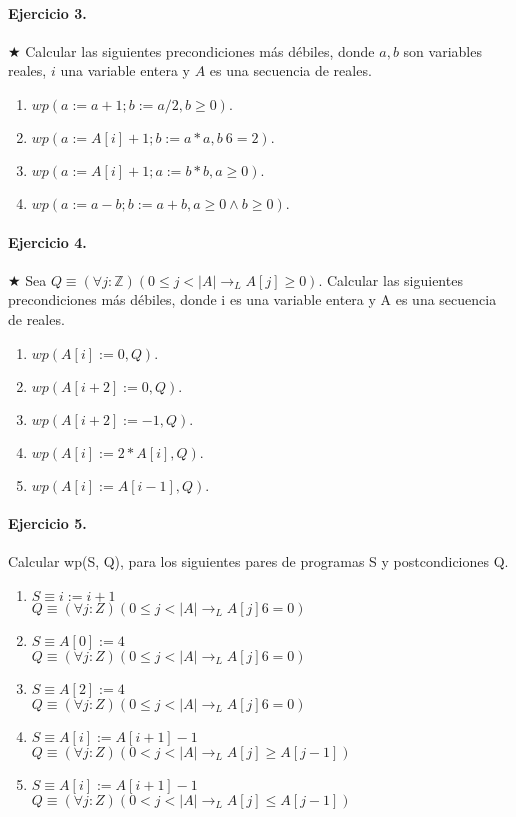 \documentclass{article}
\begin{document}
\paragraph{Ejercicio 3.} $\bigstar$ Calcular las siguientes precondiciones más débiles, donde 
$a, b$ son variables reales, $i$ una variable entera y $A$
es una secuencia de reales.

\begin{enumerate}[label=\alph*)]
\item $wp(a := a+1; b := a/2, b \geq 0).$
\item $wp(a := A[i] + 1; b := a*a, b\  6= 2).$
\item $wp(a := A[i] + 1; a := b*b, a \geq 0).$
\item $wp(a := a-b; b := a+b, a \geq 0 \wedge b \geq 0).$
\end{enumerate}

\paragraph{Ejercicio 4.} $\bigstar$ Sea $Q \equiv (\forall j :\mathbb{Z})(0 \leq j < |A| \rightarrow_L
 A[j] \geq 0)$. Calcular las 
siguientes precondiciones más débiles, donde i es
una variable entera y A es una secuencia de reales.

\begin{enumerate}[label=\alph*)]
\item $wp(A[i] := 0, Q).$
\item $wp(A[i+2] := 0, Q).$
\item $wp(A[i+2] := -1, Q).$
\item $wp(A[i] := 2 * A[i], Q).$
\item $wp(A[i] := A[i-1], Q).$
\end{enumerate}

\paragraph{Ejercicio 5.} Calcular wp(S, Q), para los siguientes pares de programas S y postcondiciones Q.

\begin{enumerate}[label=\alph*)]
\item $S \equiv i := i + 1$\\
  $Q \equiv (\forall j :Z)(0 \leq j < |A| \rightarrow_L A[j] 6= 0)$
\item $S \equiv A[0] := 4$\\
   $Q \equiv (\forall j :Z)(0 \leq j < |A| \rightarrow_L A[j] 6= 0)$
\item $S \equiv A[2] := 4$\\
   $Q \equiv (\forall j :Z)(0 \leq j < |A| \rightarrow_L A[j] 6= 0)$
\item $S \equiv A[i] := A[i+1] - 1$\\
   $Q \equiv (\forall j :Z)(0 < j < |A| \rightarrow_L A[j] \geq A[j - 1])$
\item $S \equiv A[i] := A[i+1] - 1$\\
   $Q \equiv (\forall j :Z)(0 < j < |A| \rightarrow_L A[j] \leq A[j - 1])$
\end{enumerate}
\end{document}
